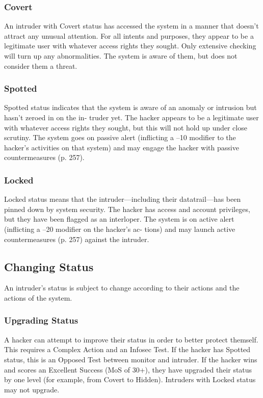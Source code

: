 \subsubsection{Covert}

An intruder with Covert status has accessed the 
system in a manner that doesn't attract any unusual 
attention. For all intents and purposes, they appear 
to be a legitimate user with whatever access rights 
they sought. Only extensive checking will turn up any 
abnormalities. The system is aware of them, but does 
not consider them a threat.

\subsubsection{Spotted}

Spotted status indicates that the system is aware of an 
anomaly or intrusion but hasn't zeroed in on the in-
truder yet. The hacker appears to be a legitimate user 
with whatever access rights they sought, but this will 
not hold up under close scrutiny. The system goes on 
passive alert (inflicting a –10 modifier to the hacker's 
activities on that system) and may engage the hacker 
with passive countermeasures (p. 257).

\subsubsection{Locked}

Locked status means that the intruder—including their 
datatrail—has been pinned down by system security. 
The hacker has access and account privileges, but they 
have been flagged as an interloper. The system is on 
active alert (inflicting a –20 modifier on the hacker's ac-
tions) and may launch active countermeasures (p. 257) 
against the intruder.

\subsection{Changing Status}

An intruder's status is subject to change according to 
their actions and the actions of the system.

\subsubsection{Upgrading Status}

A hacker can attempt to improve their status in order 
to better protect themself. This requires a Complex 
Action and an Infosec Test. If the hacker has Spotted 
status, this is an Opposed Test between monitor and 
intruder. If the hacker wins and scores an Excellent 
Success (MoS of 30+), they have upgraded their status 
by one level (for example, from Covert to Hidden). 
Intruders with Locked status may not upgrade.

